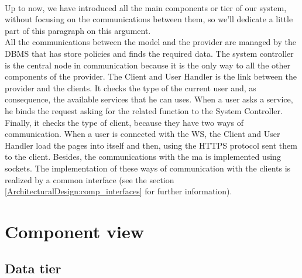 \documentclass[\mainpath/main]{subfiles}
\begin{document}
\\
Up to now, we have introduced all the main components or tier of our system, without focusing on the communications between them, so we'll dedicate a little part of this paragraph on this argument.\\
All the communications between the model and the provider are managed by the DBMS that has store policies and finds the required data. The system controller is the central node in communication because it is the only way to all the other components of the provider.
The Client and User Handler is the link between the provider and the clients. It checks the type of the current user and, as consequence, the available services that he can uses. When a user asks a service, he binds the request asking for the related function to the System Controller. Finally, it checks the type of client, because they have two ways of communication. When a user is connected with the WS, the Client and User Handler load the pages into itself and then, using the HTTPS protocol sent them to the client. Besides, the communications with the \gls{ma} is implemented using sockets. The implementation of these ways of communication with the clients is realized by a common interface (see the section \ref{ArchitecturalDesign:comp_interfaces} for further information).

\section{Component view}
\label{ArchitecturalDesign:component}


\subsection{Data tier}
\label{ArchitecturalDesign:datatier}
\end{document}
